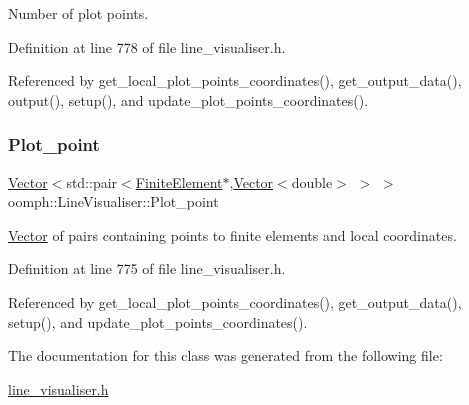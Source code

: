 Number of plot points. 



Definition at line 778 of file line\+\_\+visualiser.\+h.



Referenced by get\+\_\+local\+\_\+plot\+\_\+points\+\_\+coordinates(), get\+\_\+output\+\_\+data(), output(), setup(), and update\+\_\+plot\+\_\+points\+\_\+coordinates().

\mbox{\label{classoomph_1_1LineVisualiser_a7579006cee454ae583710599c68b7bdd}} 
\subsubsection{\texorpdfstring{Plot\+\_\+point}{Plot\_point}}
{\footnotesize\ttfamily \hyperlink{classoomph_1_1Vector}{Vector}$<$std\+::pair$<$\hyperlink{classoomph_1_1FiniteElement}{Finite\+Element}$\ast$,\hyperlink{classoomph_1_1Vector}{Vector}$<$double$>$ $>$ $>$ oomph\+::\+Line\+Visualiser\+::\+Plot\+\_\+point\hspace{0.3cm}{\ttfamily [private]}}



\hyperlink{classoomph_1_1Vector}{Vector} of pairs containing points to finite elements and local coordinates. 



Definition at line 775 of file line\+\_\+visualiser.\+h.



Referenced by get\+\_\+local\+\_\+plot\+\_\+points\+\_\+coordinates(), get\+\_\+output\+\_\+data(), setup(), and update\+\_\+plot\+\_\+points\+\_\+coordinates().



The documentation for this class was generated from the following file\+:\begin{DoxyCompactItemize}
\item 
\hyperlink{line__visualiser_8h}{line\+\_\+visualiser.\+h}\end{DoxyCompactItemize}
